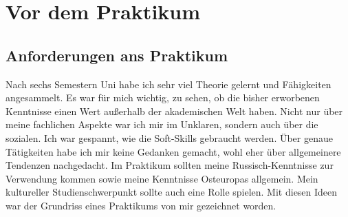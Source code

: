 \documentclass[12pt,a4paper, headsepline]{scrartcl}
\date{}
\begin{document}

\tableofcontents
\newpage

\pagestyle{headings}

\section{Vor dem Praktikum}

\subsection{Anforderungen ans Praktikum}
Nach sechs Semestern Uni habe ich sehr viel Theorie gelernt und Fähigkeiten angesammelt. Es war für mich wichtig, zu sehen, ob die bisher erworbenen Kenntnisse einen Wert außerhalb der akademischen Welt haben. Nicht nur über meine fachlichen Aspekte war ich mir im Unklaren, sondern auch über die sozialen. Ich war gespannt, wie die Soft-Skills gebraucht werden.
Über genaue Tätigkeiten habe ich mir keine Gedanken gemacht, wohl eher über allgemeinere Tendenzen nachgedacht. Im Praktikum sollten meine Russisch-Kenntnisse zur Verwendung kommen sowie meine Kenntnisse Osteuropas allgemein. Mein kultureller Studienschwerpunkt sollte auch eine Rolle spielen. Mit diesen Ideen war der Grundriss eines Praktikums von mir gezeichnet worden.
\end{document}
